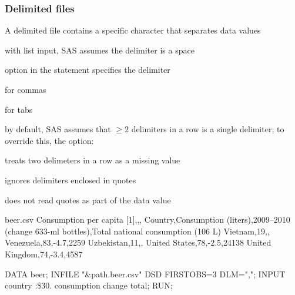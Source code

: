 \begin{frame}
\frametitle{Delimited files}
\bi
\item A delimited file contains a specific character that separates data values
\item with list input, SAS assumes the delimiter is a space
\item {} option in the  statement specifies the delimiter
\bi
\item {} for commas
\item {} for tabs
\ei
\item by default, SAS assumes that $\ge 2$ delimiters in a row is a single delimiter; to override this, the  option:
\bi
\item treats two delimeters in a row as a missing value
\item ignores delimiters enclosed in quotes
\item does not read quotes as part of the data value
\ei
\ei
\end{frame}

\begin{frame}[fragile]
\begin{craw}{.0}{beer.csv}
Consumption per capita [1],,,
Country,Consumption (liters),2009–2010 (change 633-ml bottles),Total national consumption (106 L)
Vietnam,19,,
Venezuela,83,-4.7,2259
Uzbekistan,11,,
United States,78,-2.5,24138
United Kingdom,74,-3.4,4587
\end{craw}
\vskip3pt
\begin{code}{.0}
DATA beer;
   INFILE "\&path.beer.csv" DSD FIRSTOBS=3 DLM=",";
   INPUT country :\$30. consumption change total;
RUN;
\end{code}
\emp
\end{frame}






 